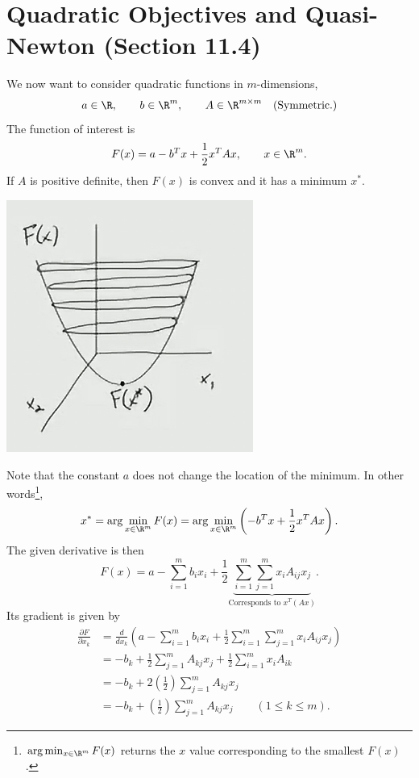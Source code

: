 \documentclass[letterpaper]{article}
\begin{document}
\section{Quadratic Objectives and Quasi-Newton (Section 11.4)}
We now want to consider quadratic functions in $m$-dimensions, 
\[a \in \R, \qquad b \in \R^m, \qquad A \in \R^{m \times m} \quad \text{(Symmetric.)}\]
The function of interest is 
\[F(x) = a - b^T x + \frac{1}{2}x^T A x, \qquad x \in \R^m.\]
If $A$ is positive definite, then $F(x)$ is convex and it has a minimum $x^*$. 
\begin{center}
    \includegraphics[scale=0.9]{../assets/convex_func.png}
\end{center}
Note that the constant $a$ does not change the location of the minimum. In other words\footnote{$\arg\min_{x \in \R^m} F(x)$ returns the $x$ value corresponding to the smallest $F(x)$.}, \[x^* = \arg \min_{x \in \R^m} F(x) = \arg \min_{x \in \R^m} \left(-b^T x + \frac{1}{2} x^T A x\right).\]
The given derivative is then 
\[F(x) = a - \sum_{i = 1}^{m} b_{i} x_{i} + \frac{1}{2} \underbrace{\sum_{i = 1}^{m} \sum_{j = 1}^{m} x_i A_{ij} x_j}_{\text{Corresponds to } x^T (Ax)}.\]
Its gradient is given by 
\begin{equation*}
    \begin{aligned}
        \frac{\partial F}{\partial x_k} &= \frac{d}{dx_k} \left(a - \sum_{i = 1}^{m} b_{i} x_{i} + \frac{1}{2} \sum_{i = 1}^{m} \sum_{j = 1}^{m} x_i A_{ij} x_j\right) \\ 
            &= -b_{k} + \frac{1}{2} \sum_{j = 1}^{m} A_{kj} x_{j} + \frac{1}{2} \sum_{i = 1}^{m} x_i A_{ik} \\ 
            &= -b_k + 2\left(\frac{1}{2}\right) \sum_{j = 1}^{m} A_{kj} x_j \\ 
            &= -b_k + \left(\frac{1}{2}\right) \sum_{j = 1}^{m} A_{kj} x_j \qquad (1 \leq k \leq m).
    \end{aligned}
\end{equation*}
\end{document}
